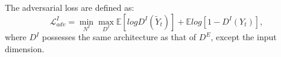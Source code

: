 The adversarial loss are defined as:
\begin{equation}
	\label{eq:inp_adver}
	\mathcal{L}^I_{adv}=\min\limits_{N^I} \max \limits_{D^I} \mathbb{E}[logD^I(\widetilde{Y}_t)]+\mathbb{E}log[1-D^I(Y_{t})],
\end{equation}
where $D^I$ possesses the same architecture as that of $D^E$, except the input dimension.



















